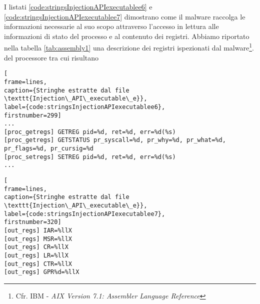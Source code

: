 \documentclass[10pt,a4paper, titlepage]{report}
\begin{document}
I listati \ref{code:stringsInjectionAPIexecutablee6} e \ref{code:stringsInjectionAPIexecutablee7} dimostrano come il malware raccolga le informazioni necessarie al suo scopo attraverso l'accesso in lettura alle informazioni di stato del processo e al contenuto dei registri. Abbiamo riportato nella tabella \ref{tab:assembly1} una descrizione dei registri ispezionati dal malware\footnote{Cfr. IBM - \textit{AIX Version 7.1: Assembler Language Reference}}. del processore tra cui risultano

\begin{lstlisting}[
frame=lines, 
caption={Stringhe estratte dal file \texttt{Injection\_API\_executable\_e}}, 
label={code:stringsInjectionAPIexecutablee6},
firstnumber=299]
...
[proc_getregs] GETREG pid=%d, ret=%d, err=%d(%s)
[proc_getregs] GETSTATUS pr_syscall=%d, pr_why=%d, pr_what=%d, pr_flags=%d, pr_cursig=%d
[proc_setregs] SETREG pid=%d, ret=%d, err=%d(%s)
...
\end{lstlisting}

\begin{lstlisting}[
frame=lines, 
caption={Stringhe estratte dal file \texttt{Injection\_API\_executable\_e}}, 
label={code:stringsInjectionAPIexecutablee7},
firstnumber=320]
[out_regs] IAR=%llX
[out_regs] MSR=%llX
[out_regs] CR=%llX
[out_regs] LR=%llX
[out_regs] CTR=%llX
[out_regs] GPR%d=%llX
\end{lstlisting}
\end{document}
